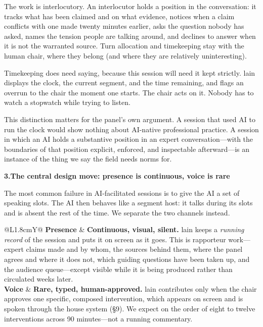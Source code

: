 \documentclass[11pt]{article}
\newcommand{\fieldlabel}[2][]{%
  \par\addvspace{1.25em}\Needspace{8\baselineskip}%
  \noindent\begin{minipage}{\linewidth}%
    {\NotoHeading\bfseries\large\color{ContentPrimary}#2}%
    \hfill{\normalfont\footnotesize\color{ContentSecondary}#1}%
  \end{minipage}\par
  \vspace{0.2em}{\color{BorderModerate}\rule{\linewidth}{0.4pt}}\par
  \vspace{0.55em}%
}
\begin{document}
The work is interlocutory. An interlocutor holds a position in the conversation:
it tracks what has been claimed and on what evidence, notices when a claim
conflicts with one made twenty minutes earlier, asks the question nobody has
asked, names the tension people are talking around, and declines to answer when
it is not the warranted source. Turn allocation and timekeeping stay with the
human chair, where they belong (and where they are relatively uninteresting).

Timekeeping does need saying, because this session will need it kept strictly.
lain displays the clock, the current segment, and the time remaining, and flags
an overrun to the chair the moment one starts. The chair acts on it. Nobody has
to watch a stopwatch while trying to listen.

This distinction matters for the panel's own argument. A session that used AI to
run the clock would show nothing about AI-native professional practice. A
session in which an AI holds a substantive position in an expert
conversation---with the boundaries of that position explicit, enforced, and
inspectable afterward---is an instance of the thing we say the field needs norms
for.

\newpage
\fieldlabel{3.\quad The central design move: presence is continuous, voice is rare}

The most common failure in AI-facilitated sessions is to give the AI a set of
speaking slots. The AI then behaves like a segment host: it talks during its
slots and is absent the rest of the time. We separate the two channels
instead.

\vspace{0.4em}
\noindent\begin{tabularx}{\linewidth}{@{}L{1.8cm}Y@{}}
\toprule
\textbf{Presence} & \textbf{Continuous, visual, silent.} lain keeps a
\emph{running record} of the session and puts it on screen as it goes. This is
rapporteur work---expert claims made and by whom, the sources behind them, where the
panel agrees and where it does not, which guiding questions have been taken up,
and the audience queue---except visible while it is being produced rather than
circulated weeks later. \\
\addlinespace[0.5em]
\textbf{Voice} & \textbf{Rare, typed, human-approved.} lain contributes only when
the chair approves one specific, composed intervention, which appears on screen
and is spoken through the house system (\S9). We expect on the order of eight to twelve
interventions across 90 minutes---not a running commentary. \\
\bottomrule
\end{tabularx}
\end{document}
